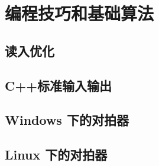 \chapter{编程技巧和基础算法}

\section{读入优化}


\section{C++标准输入输出}
















\section{Windows 下的对拍器}


\section{Linux 下的对拍器}
